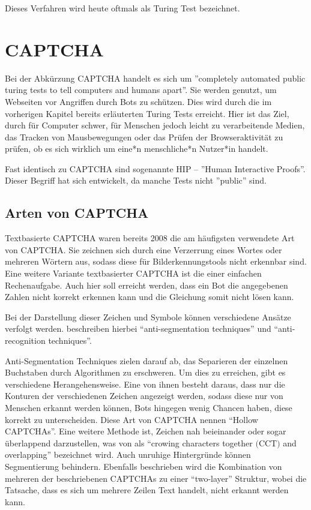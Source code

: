 Dieses Verfahren wird heute oftmals als Turing Test bezeichnet. 

\section{CAPTCHA}
Bei der Abkürzung CAPTCHA handelt es sich um ''completely automated public turing tests to tell computers and humans apart''. 
Sie werden genutzt, um Webseiten vor Angriffen durch Bots zu schützen. 
Dies wird durch die im vorherigen Kapitel bereits erläuterten Turing Tests erreicht. 
Hier ist das Ziel, durch für Computer schwer, für Menschen jedoch leicht zu verarbeitende Medien, das Tracken von Mausbewegungen
oder das Prüfen der Browseraktivität zu prüfen, ob es sich wirklich um eine*n menschliche*n Nutzer*in handelt.

Fast identisch zu CAPTCHA sind sogenannte HIP – ''Human Interactive Proofs''. 
Dieser Begriff hat sich entwickelt, da manche Tests nicht ''public'' sind. \cite[p.1]{chellapilla} \cite{tutorial} 

\subsection{Arten von CAPTCHA}

Textbasierte CAPTCHA waren bereits 2008 die am häufigsten verwendete Art von CAPTCHA.
Sie zeichnen sich durch eine Verzerrung eines Wortes oder mehreren Wörtern aus, sodass diese für Bilderkennungstools nicht erkennbar sind.
Eine weitere Variante textbasierter CAPTCHA ist die einer einfachen Rechenaufgabe. 
Auch hier soll erreicht werden, dass ein Bot die angegebenen Zahlen nicht korrekt erkennen kann und die Gleichung somit nicht lösen kann. \cite{usabilityofcaptchas} \cite[p.75]{surveyofresearch} \cite{shinde2018DIFFERENTTO} %

Bei der Darstellung dieser Zeichen und Symbole können verschiedene Ansätze verfolgt werden.
\citeauthor{surveyofresearch} beschreiben hierbei ``anti-segmentation techniques'' und ``anti-recognition techniques''. \cite[p.76]{surveyofresearch}

Anti-Segmentation Techniques zielen darauf ab, das Separieren der einzelnen Buchstaben durch Algorithmen zu erschweren. 
Um dies zu erreichen, gibt es verschiedene Herangehensweise.
Eine von ihnen besteht daraus, dass nur die Konturen der verschiedenen Zeichen angezeigt werden, sodass diese nur von Menschen erkannt werden können,
Bots hingegen wenig Chancen haben, diese korrekt zu unterscheiden. Diese Art von CAPTCHA nennen \citeauthor{surveyofresearch} ``Hollow CAPTCHAs''. %
Eine weitere Methode ist, Zeichen nah beieinander oder sogar überlappend darzustellen, 
was von \citeauthor{surveyofresearch} als ``crowing characters together $($CCT$)$ and overlapping'' bezeichnet wird.
Auch unruhige Hintergründe können Segmentierung behindern.
Ebenfalls beschrieben wird die Kombination von mehreren der beschriebenen CAPTCHAs zu einer ``two-layer'' Struktur,
wobei die Tatsache, dass es sich um mehrere Zeilen Text handelt, nicht erkannt werden kann.

